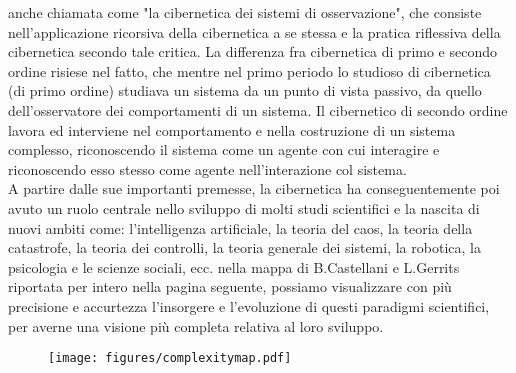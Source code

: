 anche chiamata come "la cibernetica dei sistemi di osservazione",
che consiste nell'applicazione
ricorsiva della cibernetica a se stessa e la pratica riflessiva della cibernetica
secondo tale critica.
La differenza fra cibernetica di primo e secondo ordine risiese nel fatto,
che mentre nel primo periodo lo studioso di cibernetica (di primo ordine)
studiava un sistema da un punto di vista passivo, da quello dell'osservatore
dei comportamenti di un sistema.
Il  cibernetico di secondo ordine lavora ed interviene nel comportamento
e nella costruzione di un sistema complesso,
riconoscendo il sistema come un agente con cui interagire e
riconoscendo esso stesso come agente nell'interazione col sistema.
\\
A partire dalle sue importanti premesse,
la cibernetica ha conseguentemente poi avuto un ruolo centrale nello sviluppo di
molti studi scientifici e la nascita
di nuovi ambiti come: l'intelligenza artificiale, la teoria del caos,
la teoria della catastrofe,
la teoria dei controlli, la teoria generale dei sistemi, la robotica,
la psicologia e le scienze sociali,
ecc.
nella mappa di B.Castellani e L.Gerrits riportata per intero nella pagina seguente,
possiamo visualizzare con più precisione e accurtezza
l'insorgere e l'evoluzione di questi paradigmi scientifici, per averne una
visione più completa relativa al loro sviluppo.

\clearpage

\begin{figure}[!h]
    \centering
    \texttt{[image: figures/complexitymap.pdf]}
    \label{fig:figure}
\end{figure}

\clearpage


